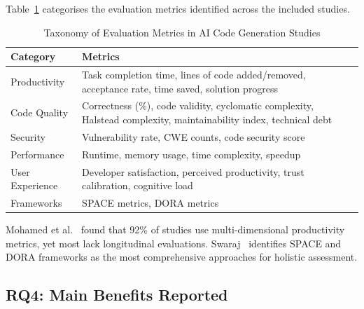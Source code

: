 \documentclass[journal,twoside,10pt]{IEEEtran}
\begin{document}
Table~\ref{tab:metrics} categorises the evaluation metrics identified across
the included studies.

\begin{table}[!t]
  \caption{Taxonomy of Evaluation Metrics in AI Code Generation Studies}
  \label{tab:metrics}
  \centering
  \renewcommand{\arraystretch}{1.2}
  \begin{tabular}{p{}p{}}
    \toprule
    \textbf{Category} & \textbf{Metrics} \\
    \midrule
    Productivity &
      Task completion time, lines of code added/removed,
      acceptance rate, time saved, solution progress \\
    \midrule
    Code Quality &
      Correctness (\%), code validity, cyclomatic complexity,
      Halstead complexity, maintainability index, technical debt \\
    \midrule
    Security &
      Vulnerability rate, CWE counts, code security score \\
    \midrule
    Performance &
      Runtime, memory usage, time complexity, speedup \\
    \midrule
    User Experience &
      Developer satisfaction, perceived productivity,
      trust calibration, cognitive load \\
    \midrule
    Frameworks &
      SPACE metrics, DORA metrics \\
    \bottomrule
  \end{tabular}
\end{table}

Mohamed et al.~\cite{mohamed2025slr} found that 92\% of studies use
multi-dimensional productivity metrics, yet most lack longitudinal evaluations.
Swaraj~\cite{swaraj2025llm} identifies SPACE and DORA frameworks as the most
comprehensive approaches for holistic assessment.

\subsection{RQ4: Main Benefits Reported}
\end{document}
